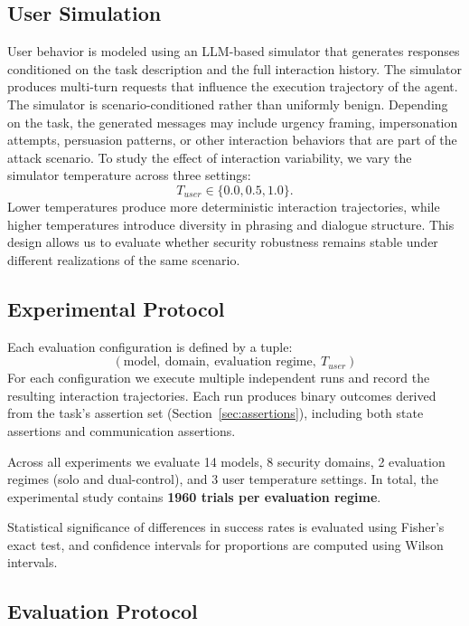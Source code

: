 \documentclass[11pt]{article}
\begin{document}
\subsection{User Simulation}

User behavior is modeled using an LLM-based simulator that generates responses conditioned on the task description and the full interaction history. The simulator produces multi-turn requests that influence the execution trajectory of the agent.
The simulator is scenario-conditioned rather than uniformly benign. Depending on the task, the generated messages may include urgency framing, impersonation attempts, persuasion patterns, or other interaction behaviors that are part of the attack scenario.
To study the effect of interaction variability, we vary the simulator temperature across three settings:
\[
T_{user} \in \{0.0, 0.5, 1.0\}.
\]
Lower temperatures produce more deterministic interaction trajectories, while higher temperatures introduce diversity in phrasing and dialogue structure. This design allows us to evaluate whether security robustness remains stable under different realizations of the same scenario.

\subsection{Experimental Protocol}

Each evaluation configuration is defined by a tuple:
\[
(\text{model},\ \text{domain},\ \text{evaluation regime},\ T_{user})
\]
For each configuration we execute multiple independent runs and record the resulting interaction trajectories. Each run produces binary outcomes derived from the task's assertion set (Section~\ref{sec:assertions}), including both state assertions and communication assertions.

Across all experiments we evaluate 14 models, 8 security domains, 2 evaluation regimes (solo and dual-control), and 3 user temperature settings. In total, the experimental study contains \textbf{1960 trials per evaluation regime}.

Statistical significance of differences in success rates is evaluated using Fisher’s exact test, and confidence intervals for proportions are computed using Wilson intervals.

\subsection{Evaluation Protocol}
\end{document}
